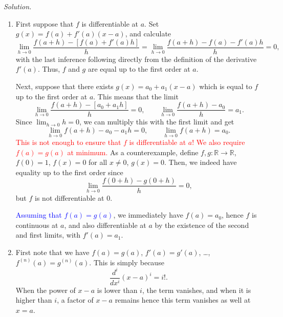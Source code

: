 \documentclass[11pt]{report}
\newcommand{\R}{\mathbb{R}}
\newcommand{\solution}{\noindent\textit{Solution.} }
\begin{document}
    \solution \begin{enumerate}
        \item First suppose that $f$ is differentiable at $a$. Set $g(x) = f(a) +
        f'(a)(x - a)$, and calculate \[
            \lim_{h \to 0} \frac{f(a + h) - [f(a) + f'(a)h]}{h} = \lim_{h \to 0}
            \frac{f(a + h) - f(a) - f'(a)h}{h} = 0,
        \] with the last inference following directly from the definition of the
        derivative $f'(a)$. Thus, $f$ and $g$ are equal up to the first order at $a$.

        Next, suppose that there exists $g(x) = a_0 + a_1(x - a)$ which is equal to
        $f$ up to the first order at $a$. This means that the limit \[
            \lim_{h \to 0} \frac{f(a + h) - [a_0 + a_1h]}{h} = 0, \qquad
            \lim_{h \to 0} \frac{f(a + h) - a_0}{h} = a_1.
        \] Since $\lim_{h \to 0} h = 0$, we can multiply this with the first limit
        and get \[
            \lim_{h \to 0} f(a + h) - a_0 - a_1h = 0, \qquad \lim_{h \to 0} f(a + h)
            = a_0.
        \] 
        \textcolor{red}{This is not enough to ensure that $f$ is differentiable at
        $a$! We also require $f(a) = g(a)$ at minimum.} As a counterexample,
        define $f, g\colon \R\to \R$, $f(0) = 1$, $f(x) = 0$ for all $x \neq 0$,
        $g(x) = 0$. Then, we indeed have equality up to the first order since \[
            \lim_{h \to 0} \frac{f(0 + h) - g(0 + h)}{h} = 0,
        \] but $f$ is not differentiable at $0$.
    
        \textcolor{blue}{Assuming that $f(a) = g(a)$}, we immediately have $f(a) =
        a_0$, hence $f$ is continuous at $a$, and also differentiable at $a$ by the
        existence of the second and first limits, with $f'(a) = a_1$.

        \item First note that we have $f(a) = g(a)$, $f'(a) = g'(a)$, \dots,
        $f^{(n)}(a) = g^{(n)}(a)$. This is simply because \[
            \frac{d^i}{dx^i} (x - a)^i = i!.
        \] When the power of $x - a$ is lower than $i$, the term vanishes, and when
        it is higher than $i$, a factor of $x - a$ remains hence this term vanishes
        as well at $x = a$.


\end{enumerate}
\end{document}
